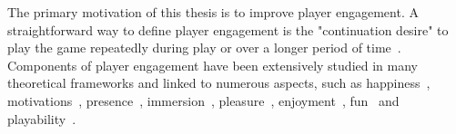 The primary motivation of this thesis is to improve player engagement. A straightforward way to define player engagement is the "continuation desire" to play the game repeatedly during play or over a longer period of time~\cite{schoenau2011player}. Components of player engagement have been extensively studied in many theoretical frameworks and linked to numerous aspects, such as happiness~\cite{sweetser2005gameflow,flow1990psychology,chen2007flow}, motivations~\cite{przybylski2010motivational,ryan2006motivational,yee2006demographics,yee2006motivations,sherry2006video}, presence~\cite{lombard1997heart,tamborini2006role}, immersion~\cite{mcmahan2003immersion,brown2004grounded,jennett2008measuring,ermi2005fundamental}, pleasure~\cite{costello2009tool}, enjoyment~\cite{ravaja2007fun,klimmt2003dimensions,mekler2014systematic}, fun~\cite{koster2013theory} and playability~\cite{federoff2003improving,federoff2002heuristics,desurvire2004using,nacke2009playability}.

